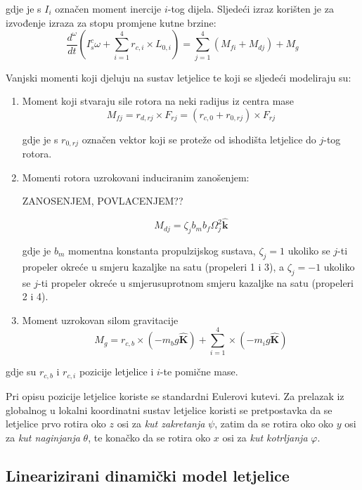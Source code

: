 \documentclass[11pt,a4paper]{article}
\begin{document}
gdje je s $I_{i}$ označen moment inercije $i$-tog dijela. Sljedeći izraz korišten je za izvođenje izraza za stopu promjene kutne brzine:
\begin{equation}
\frac{d^{\omega}}{dt} \left( I_{s}^{c} \omega + \sum_{i=1}^{4} r_{c,i}\times L_{0,i}  \right) = \sum_{j=1}^{4}(M_{fi} + M_{dj}) + M_{g}
\label{eq:dtM}
\end{equation}


Vanjski momenti koji djeluju na sustav letjelice te koji se sljedeći modeliraju su:
\begin{enumerate}
\item Moment koji stvaraju sile rotora na neki radijus iz centra mase
\begin{equation}
M_{fj} = r_{d,rj} \times F_{rj} = (r_{c,0} + r_{0,rj}) \times F_{rj}
\label{eq:Mfj}
\end{equation}

gdje je s $r_{0,rj}$ označen vektor koji se proteže od ishodišta letjelice do $j$-tog rotora.

\item Momenti rotora uzrokovani induciranim zanošenjem:

ZANOSENJEM, POVLACENJEM??

\begin{equation}
M_{dj} = \zeta_{j}b_{m}b_{f}\Omega_{j}^{2} \bm{\hat{k}}
\label{eq:Mdj}
\end{equation}

gdje je $b_{m}$ momentna konstanta propulzijskog sustava, $\zeta_{j} =  1$ ukoliko se $j$-ti propeler okreće u smjeru kazaljke na satu (propeleri 1 i 3), a $\zeta_{j} =  -1$ ukoliko se $j$-ti propeler okreće u smjerusuprotnom smjeru kazaljke na satu (propeleri 2 i 4).

\item Moment uzrokovan silom gravitacije
\begin{equation}
M_{g} = r_{c,b} \times (-m_{b}g \bm{\hat{K}}) + \sum_{i=1}^{4} \times (-m_{i}g \bm{\hat{K}})
\label{eq:Mg}
\end{equation}
\end{enumerate}

gdje su $r_{c,b}$ i $r_{c,i}$ pozicije letjelice i $i$-te pomične mase.

Pri opisu pozicije letjelice koriste se standardni Eulerovi kutevi. Za prelazak iz globalnog u lokalni koordinatni sustav letjelice koristi se pretpostavka da se letjelice prvo rotira oko $z$ osi za \textit{kut zakretanja} $\psi$, zatim da se rotira oko oko $y$ osi za \textit{kut naginjanja} $\theta$, te konačko da se rotira oko $x$ osi za \textit{kut kotrljanja} $\varphi$.



\subsection{Linearizirani dinamički model letjelice}
\end{document}
